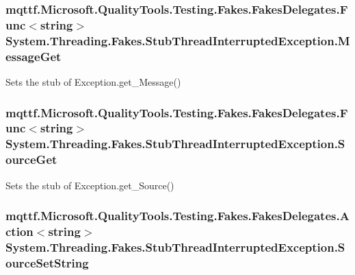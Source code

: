 \hypertarget{class_system_1_1_threading_1_1_fakes_1_1_stub_thread_interrupted_exception_a5a975c045692748a5ce6a00d29fee107}{
\subsubsection[{Message\-Get}]{\setlength{\rightskip}{0pt plus 5cm}mqttf.\-Microsoft.\-Quality\-Tools.\-Testing.\-Fakes.\-Fakes\-Delegates.\-Func$<$string$>$ System.\-Threading.\-Fakes.\-Stub\-Thread\-Interrupted\-Exception.\-Message\-Get}}\label{class_system_1_1_threading_1_1_fakes_1_1_stub_thread_interrupted_exception_a5a975c045692748a5ce6a00d29fee107}


Sets the stub of Exception.\-get\-\_\-\-Message()

\hypertarget{class_system_1_1_threading_1_1_fakes_1_1_stub_thread_interrupted_exception_a3b5dab585f05b2df2ca53c0cfc0c5857}{
\subsubsection[{Source\-Get}]{\setlength{\rightskip}{0pt plus 5cm}mqttf.\-Microsoft.\-Quality\-Tools.\-Testing.\-Fakes.\-Fakes\-Delegates.\-Func$<$string$>$ System.\-Threading.\-Fakes.\-Stub\-Thread\-Interrupted\-Exception.\-Source\-Get}}\label{class_system_1_1_threading_1_1_fakes_1_1_stub_thread_interrupted_exception_a3b5dab585f05b2df2ca53c0cfc0c5857}


Sets the stub of Exception.\-get\-\_\-\-Source()

\hypertarget{class_system_1_1_threading_1_1_fakes_1_1_stub_thread_interrupted_exception_a52019c51863126eead61f02961ac8fc8}{
\subsubsection[{Source\-Set\-String}]{\setlength{\rightskip}{0pt plus 5cm}mqttf.\-Microsoft.\-Quality\-Tools.\-Testing.\-Fakes.\-Fakes\-Delegates.\-Action$<$string$>$ System.\-Threading.\-Fakes.\-Stub\-Thread\-Interrupted\-Exception.\-Source\-Set\-String}}\label{class_system_1_1_threading_1_1_fakes_1_1_stub_thread_interrupted_exception_a52019c51863126eead61f02961ac8fc8}


